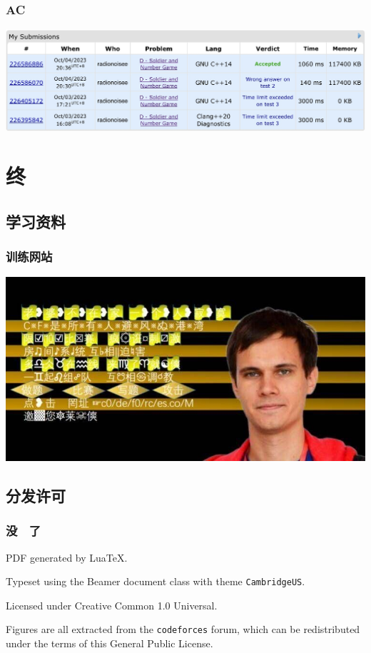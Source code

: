\documentclass{beamer}
\begin{document}
\begin{frame}
  \frametitle{AC}
  \centering
  \includegraphics[width=.9\hsize]{smhist}
\end{frame}

\section{终}

\subsection{学习资料}

\begin{frame}
  \frametitle{训练网站}
  \centering
  \includegraphics[width=.9\hsize]{codeforces}
\end{frame}

\subsection{分发许可}

\begin{frame}
  \frametitle{没　了}
  PDF generated by Lua\TeX.

  Typeset using the \textsf{Beamer} document class with theme \texttt{CambridgeUS}.

  Licensed under Creative Common 1.0 Universal.

  Figures are all extracted from the \texttt{codeforces} forum, which can be redistributed under the terms of this General Public License.
\end{frame}
\end{document}
